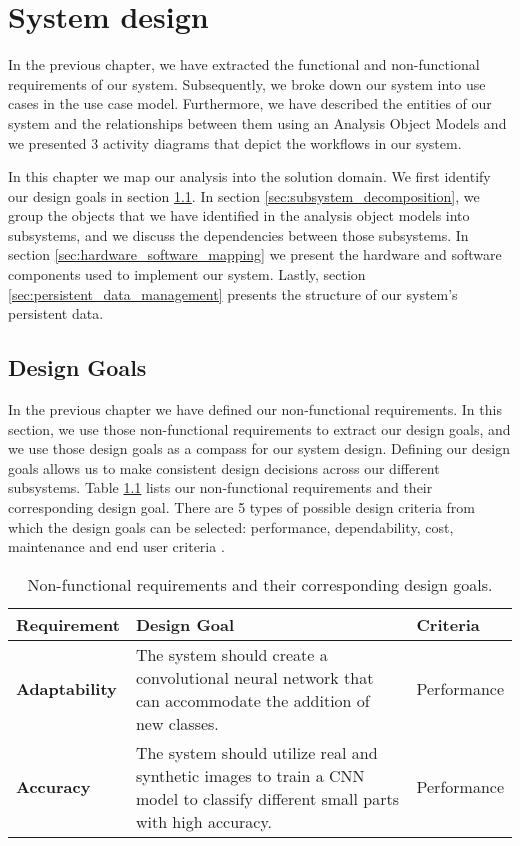 \chapter{System design}\label{ch:system_design}

In the previous chapter, we have extracted the functional and non-functional requirements of our system. Subsequently, we broke down our system into use cases in the use case model. Furthermore, we have described the entities of our system and the relationships between them using an Analysis Object Models and we presented 3 activity diagrams that depict the workflows in our system.

In this chapter we map our analysis into the solution domain. We first identify our design goals in section \ref{sec:design_goals}. In section \ref{sec:subsystem_decomposition}, we group the objects that we have identified in the analysis object models into subsystems, and we discuss the dependencies between those subsystems. In section \ref{sec:hardware_software_mapping} we present the hardware and software components used to implement our system. Lastly, section \ref{sec:persistent_data_management} presents the structure of our system's persistent data.


\section{Design Goals}\label{sec:design_goals}

In the previous chapter we have defined our non-functional requirements. In this section, we use those non-functional requirements to extract our design goals, and we use those design goals as a compass for our system design. Defining our design goals allows us to make consistent design decisions across our different subsystems. Table \ref{tab:DG} lists our non-functional requirements and their corresponding design goal. There are 5 types of possible design criteria from which the design goals can be selected: performance, dependability, cost, maintenance and end user criteria \cite{bruegge2004object}.

\begin{table}
  \centering
  \begin{tabular}{ | l | p{5cm} | l | }
    \hline
    \textbf{Requirement} & \textbf{Design Goal} & \textbf{Criteria} \\ \hline
    \textbf{Adaptability} & The system should create a convolutional neural network that can accommodate the addition of new classes. & Performance \\ \hline
    \textbf{Accuracy} & The system should utilize real and synthetic images to train a CNN model to classify different small parts with high accuracy. & Performance \\ \hline
  \end{tabular}
  \caption{Non-functional requirements and their corresponding design goals.}
  \label{tab:DG}
\end{table}


